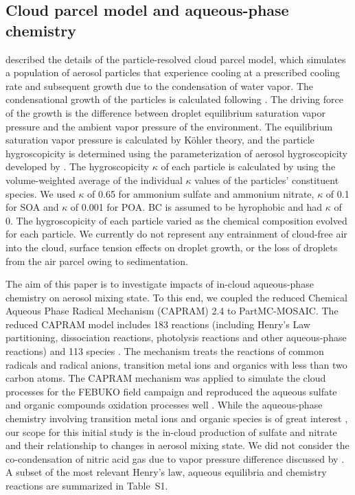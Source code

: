 \documentclass[edeposit,fullpage]{uiucthesis2009}
\begin{document}
\subsection{Cloud parcel model and aqueous-phase chemistry}
\citet{ching2012impacts} described the details of the particle-resolved cloud
parcel model, which simulates a population of aerosol particles that
experience cooling at a prescribed cooling rate and subsequent growth
due to the condensation of water vapor. The condensational growth of
the particles is calculated following \citet{Seinfeld2016}. The
driving force of the growth is the difference between droplet
equilibrium saturation vapor pressure and the ambient vapor pressure
of the environment. The equilibrium saturation vapor pressure is
calculated by K\"ohler theory, and the particle hygroscopicity is
determined using the parameterization of aerosol hygroscopicity
developed by \citet{Petters2007}. The hygroscopicity $\kappa$
  of each particle is calculated by using the volume-weighted average
  of the individual $\kappa$ values of the particles' constituent
  species. We used $\kappa$ of 0.65 for ammonium sulfate and ammonium nitrate,
  $\kappa$ of 0.1 for SOA and $\kappa$ of 0.001 for POA.  BC is
  assumed to be hyrophobic and had $\kappa$ of 0.  The hygroscopicity
  of each particle varied as the chemical composition evolved for each
  particle. We currently do not represent any entrainment of
cloud-free air into the cloud, surface tension effects on droplet
growth, or the loss of droplets from the air parcel owing to
sedimentation.

The aim of this paper is to investigate impacts of in-cloud
aqueous-phase chemistry on aerosol mixing state. To this end, we
coupled the reduced Chemical Aqueous Phase Radical Mechanism (CAPRAM)
2.4 to PartMC-MOSAIC. The reduced CAPRAM model includes 183 reactions
(including Henry's Law partitioning, dissociation reactions,
photolysis reactions and other aqueous-phase reactions) and 113
species \citep{Herrmann1999, ervens2003capram}. The mechanism
treats the reactions of common radicals and radical anions, transition
metal ions and organics with less than two carbon atoms. The CAPRAM
mechanism was applied to simulate the cloud processes for the FEBUKO
field campaign and reproduced the aqueous sulfate and organic
compounds oxidation processes well \citep{Tilgner2005, Wolke2005}.
While the aqueous-phase chemistry involving transition metal ions and
organic species is of great interest
\citep{Mayol-Bracero2002,Harris2013a, Alexander2009, Lian2019,
    McNeill2015a, Smith2014, wonaschuetz2012aerosol,wagner2015situ},
our scope for this initial study is the in-cloud production of
  sulfate and nitrate and their relationship to changes in aerosol
  mixing state. We did not consider the co-condensation of nitric acid
  gas due to vapor pressure difference discussed by
  \citet{crooks2018parameterisation}. A subset of the most relevant
Henry's law, aqueous equilibria and chemistry reactions are summarized
in Table~S1.
\end{document}

